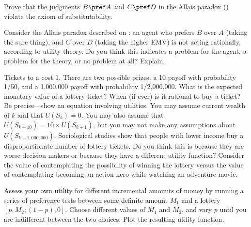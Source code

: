 \begin{exercise}
Prove that the judgments \(B \pref A\) and \(C \pref D\) in the Allais paradox ()
violate the axiom of substitutability.
\end{exercise} 

\begin{exercise}
Consider the Allais paradox described on :
an agent who prefers \(B\) over \(A\) (taking the
sure thing), and \(C\) over \(D\) (taking the higher EMV) is not
acting rationally, according to utility theory.  Do you think this indicates
a problem for the agent, a problem for the theory, or no problem at all? Explain.
\end{exercise} 



\begin{uexercise}
Tickets to a  cost {\DollarSign}1.  There are two
possible prizes: a {\DollarSign}10 payoff with probability 1/50, and a
{\DollarSign}1,000,000 payoff with probability 1/2,000,000.  What is the expected
monetary value of a lottery ticket?  When (if ever) is it rational to
buy a ticket?  Be precise---show an equation involving utilities.  You
may assume current wealth of {\DollarSign}\(k\) and that \(U(S_k)=0\).  You may also
assume that \(U(S_{k+{10}}) = {10}\times U(S_{k+1})\), but you may not make
any assumptions about \(U(S_{k+1,{000},{000}})\).  Sociological studies show
that people with lower income buy a disproportionate number of lottery
tickets.  Do you think this is because they are worse decision makers
or because they have a different utility function?  Consider the value of 
contemplating the possibility of winning the lottery versus the value of
contemplating becoming an action hero while watching an adventure movie.
\end{uexercise} 

\begin{exercise}%
Assess your own utility for different incremental amounts of money
by running a series of preference tests between some definite amount \(M_1\) and
a lottery \([p,M_2; (1-p), 0]\).  Choose different values of \(M_1\) and \(M_2\),
and vary \(p\) until you are indifferent between the two choices. Plot the
resulting utility function.
\end{exercise} 

